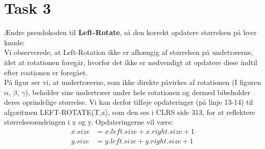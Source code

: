 \section{Task 3}

Ændre pseudokoden til \textbf{Left-Rotate}, så den korrekt opdatere størrelsen på hver knude:\\

Vi observerede, at Left-Rotation ikke er afhængig af størrelsen på undetræerne, idet at rotationen foregår, hvorfor det ikke er nødvendigt at opdatere disse indtil efter roationen er foregået.\\
På figur  ser vi, at undertræerne, som ikke direkte påvirkes af rotationen (I figuren $\alpha$, $\beta$, $\gamma$), beholder sine undertræer under hele rotationen og dermed bibeholder deres oprindelige størrelse.
Vi kan derfor tilføje opdateringer (på linje 13-14) til algoritmen LEFT-ROTATE(T,x), som den ses i CLRS side 313, for at reflektere størrelsesændringen i x og y. Opdateringerne vil være:
\begin{align*}
  x.size &= x.left.size + x.right.size + 1\\
  y.size &= y.left.size + y.right.size + 1
\end{align*}
